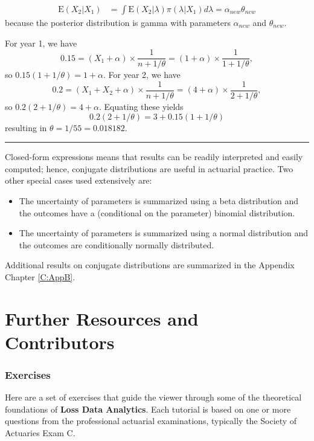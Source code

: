 \documentclass[]{book}
\providecommand{\tightlist}{%
  \setlength{\itemsep}{0pt}\setlength{\parskip}{0pt}}
\theoremstyle{definition}
\theoremstyle{definition}
\theoremstyle{definition}
\theoremstyle{remark}
\begin{document}
\[
\begin{aligned}
\mathrm{E}(X_2|X_1)
&= \int \mathrm{E}(X_2|\lambda) \pi(\lambda|X_1) d\lambda = \alpha_{new} \theta_{new}
\end{aligned}
\] because the posterior distribution is gamma with parameters
\(\alpha_{new}\) and \(\theta_{new}\).

For year 1, we have \[
0.15 = (X_1 + \alpha) \times \frac{1}{n+1/\theta} = (1 + \alpha) \times \frac{1}{1+1/\theta},
\] so \(0.15(1+1/\theta)= 1 + \alpha.\) For year 2, we have \[
0.2 = (X_1+X_2 + \alpha) \times \frac{1}{n+1/\theta} = (4 + \alpha) \times \frac{1}{2+1/\theta},
\] so \(0.2(2+1/\theta)= 4 + \alpha.\) Equating these yields \[
0.2(2+1/\theta)=3 + 0.15(1+1/\theta)
\] resulting in \(\theta = 1/55 = 0.018182\).

\begin{center}\rule{0.5\linewidth}{\linethickness}\end{center}

Closed-form expressions means that results can be readily interpreted
and easily computed; hence, conjugate distributions are useful in
actuarial practice. Two other special cases used extensively are:

\begin{itemize}
\tightlist
\item
  The uncertainty of parameters is summarized using a beta distribution
  and the outcomes have a (conditional on the parameter) binomial
  distribution.
\item
  The uncertainty of parameters is summarized using a normal
  distribution and the outcomes are conditionally normally distributed.
\end{itemize}

Additional results on conjugate distributions are summarized in the
Appendix Chapter \ref{C:AppB}.

\section{Further Resources and
Contributors}\label{MS:further-reading-and-resources}

\subsubsection*{Exercises}\label{exercises-2}

Here are a set of exercises that guide the viewer through some of the
theoretical foundations of \textbf{Loss Data Analytics}. Each tutorial
is based on one or more questions from the professional actuarial
examinations, typically the Society of Actuaries Exam C.
\end{document}
